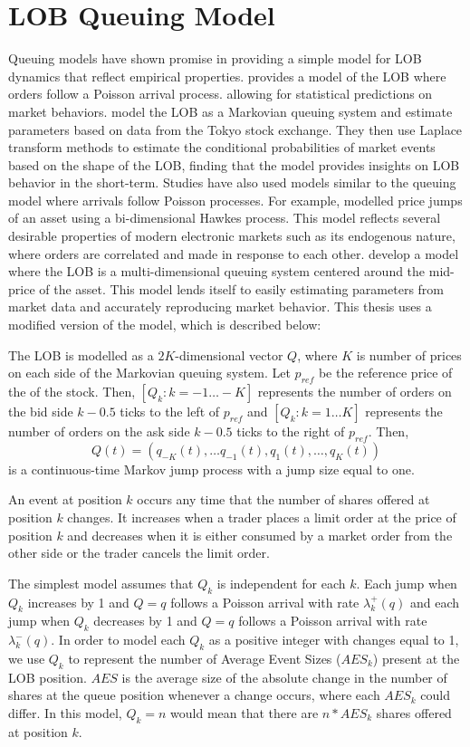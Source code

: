 \section{LOB Queuing Model} \label{modelLOB}
Queuing models have shown promise in providing a simple model for LOB dynamics that reflect empirical properties. \cite{A6a} provides a model of the LOB where orders follow a Poisson arrival process. allowing for statistical predictions on market behaviors. \cite{A6b} model the LOB as a Markovian queuing system and estimate parameters based on data from the Tokyo stock exchange. They then use Laplace transform methods to estimate the conditional probabilities of market events based on the shape of the LOB, finding that the model provides insights on LOB behavior in the short-term. Studies have also used models similar to the queuing model where arrivals follow Poisson processes. For example, \cite{A9} modelled price jumps of an asset using a bi-dimensional Hawkes process. This model reflects several desirable properties of modern electronic markets such as its endogenous nature, where orders are correlated and made in response to each other. \cite{A6} develop a model where the LOB is a multi-dimensional queuing system centered around the mid-price of the asset. This model lends itself to easily estimating parameters from market data and accurately reproducing market behavior. This thesis uses a modified version of the model, which is described below:

The LOB is modelled as a $2K$-dimensional vector $Q$, where $K$ is number of prices on each side of the Markovian queuing system. Let $p_{ref}$ be the reference price of the of the stock. Then, $[Q_k: k = -1 \ldots -K]$ represents the number of orders on the bid side $k - 0.5$ ticks to the left of $p_{ref}$ and $[Q_k: k =1 \ldots K]$ represents the number of orders on the ask side $k - 0.5$ ticks to the right of $p_{ref}$. Then, $$Q(t) = (q_{-K}(t), … q_{-1}(t), q_1(t), … , q_K(t))$$ is a continuous-time Markov jump process with a jump size equal to one.

An event at position $k$ occurs any time that the number of shares offered at position $k$ changes. It increases when a trader places a limit order at the price of position $k$ and decreases when it is either consumed by a market order from the other side or the trader cancels the limit order.

The simplest model assumes that $Q_k$ is independent for each $k$. Each jump when $Q_k$ increases by 1 and $Q = q$ follows a Poisson arrival with rate $\lambda^+_k(q)$ and each jump when $Q_k$ decreases by 1 and $Q = q$ follows a Poisson arrival with rate $\lambda^-_k(q)$. In order to model each $Q_k$ as a positive integer with changes equal to 1, we use $Q_k$ to represent the number of Average Event Sizes ($AES_k$) present at the LOB position. $AES$ is the average size of the absolute change in the number of shares at the queue position whenever a change occurs, where each $AES_k$ could differ. In this model, $Q_k = n$ would mean that there are $n*AES_k$ shares offered at position $k$.

